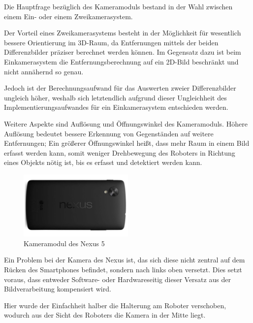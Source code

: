 Die Hauptfrage bezüglich des Kameramoduls bestand in der Wahl zwischen einem Ein- oder einem Zweikamerasystem.

Der Vorteil eines Zweikamerasystems besteht in der Möglichkeit für wesentlich bessere Orientierung im 3D-Raum, da Entfernungen mittels der beiden Differenzbilder präziser berechnet werden können.
Im Gegensatz dazu ist beim Einkamerasystem die Entfernungsberechnung auf ein 2D-Bild beschränkt und nicht annähernd so genau.

Jedoch ist der Berechnungsaufwand für das Auswerten zweier Differenzbilder ungleich höher, weshalb sich letztendlich aufgrund dieser Ungleichheit des Implementierungsaufwandes für ein Einkamerasystem entschieden werden.

Weitere Aspekte sind Auflösung und Öffnungswinkel des Kameramoduls.
Höhere Auflösung bedeutet bessere Erkennung von Gegenständen auf weitere Entfernungen; Ein größerer Öffnungswinkel heißt, dass mehr Raum in einem Bild erfasst werden kann, somit weniger Drehbewegung des Roboters in Richtung eines Objekts nötig ist, bis es erfasst und detektiert werden kann.

\begin{figure}[h]
\centering
\includegraphics[width=0.5\textwidth]{Bilder/Robot/nexus_backside}
\caption{Kameramodul des Nexus 5}
\label{fig:camera}
\end{figure}

Ein Problem bei der Kamera des Nexus ist, das sich diese nicht zentral auf dem Rücken des Smartphones befindet, sondern nach links oben versetzt. Dies setzt voraus, dass entweder Software- oder Hardwareseitig dieser Versatz aus der Bildverarbeitung kompensiert wird.

Hier wurde der Einfachheit halber die Halterung am Roboter verschoben, wodurch aus der Sicht des Roboters die Kamera in der Mitte liegt.
